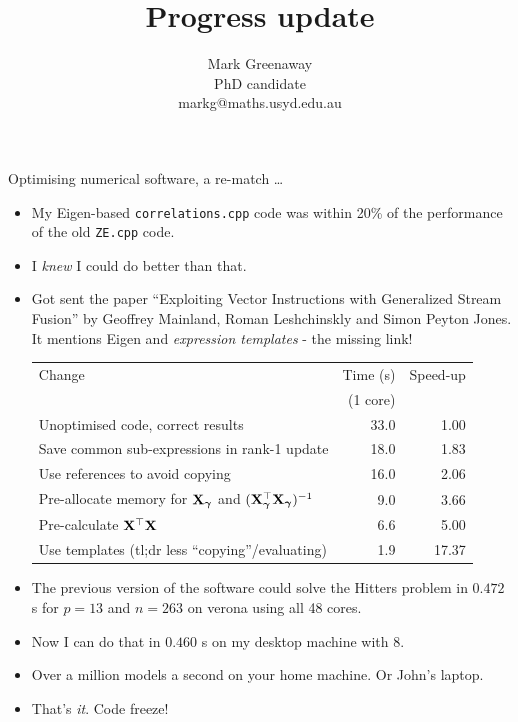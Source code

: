 \documentclass{beamer}
\title{Progress update}
\author{Mark Greenaway\\PhD candidate\\markg@maths.usyd.edu.au}
\begin{document}
\begin{frame}
\titlepage
\end{frame}

\begin{frame}{Optimising numerical software, a re-match \ldots}
\scriptsize
\begin{itemize}
\item My Eigen-based \texttt{correlations.cpp} code was within 20\% of the performance of the old
			\texttt{ZE.cpp} code.
\item I \emph{knew} I could do better than that.
\item Got sent the paper ``Exploiting Vector Instructions with Generalized Stream Fusion'' by Geoffrey 
			Mainland, Roman Leshchinskly and Simon Peyton Jones. It mentions Eigen and \emph{expression templates} -
			the missing link!
\begin{tabular}{|p{5cm}|rr|}
\hline
Change & Time (s) & Speed-up \\
& (1 core) & \\
\hline
Unoptimised code, correct results & 33.0 & 1.00\\
Save common sub-expressions in rank-1 update & 18.0 & 1.83 \\
Use references to avoid copying & 16.0 & 2.06 \\
Pre-allocate memory for ${\bf X}_{\boldsymbol \gamma}$ and $({\bf X}_{\boldsymbol \gamma}^\top {\bf X}_{\boldsymbol \gamma})^{-1}$ & 9.0 & 3.66 \\
Pre-calculate ${\bf X}^\top {\bf X}$ & 6.6 & 5.00 \\
Use templates (tl;dr less ``copying''/evaluating) & 1.9 & 17.37 \\
\hline
\end{tabular}
\item The previous version of the software could solve the Hitters problem in
$0.472$ s for $p=13$ and $n=263$ on verona using all 48 cores. 
\item Now I can do that in $0.460$ s on my desktop machine with 8.
\item Over a million models a second on your home machine. Or John's laptop.
\item That's \emph{it}. Code freeze!
\end{itemize}
\end{frame}
\end{document}
